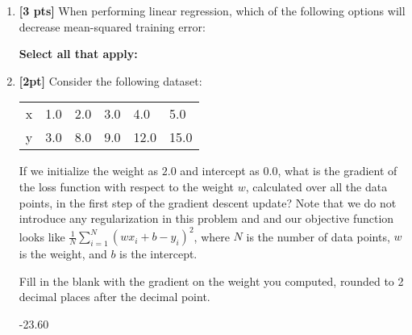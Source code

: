 \begin{enumerate}
    
    
    \newpage
    \item \textbf{[3 pts]} When performing linear regression, which of the following options will decrease mean-squared training error:
    
    \textbf{Select all that apply:}


    
    \item \textbf{[2pt]} \label{Q7_linear_regression} Consider the following dataset:
    \begin{table}[H]
    \centering
        \begin{tabular}{llllll}
        x & 1.0 & 2.0 & 3.0 & 4.0 & 5.0 \\
        y & 3.0 & 8.0 & 9.0 & 12.0 & 15.0
        \end{tabular}
    \end{table}
    If we initialize the weight as $2.0$ and intercept as $0.0$, what is the gradient of the loss function with respect to the weight $w$, calculated over all the data points, in the first step of the gradient descent update? Note that we do not introduce any regularization in this problem and and our objective function looks like $\frac{1}{N}\sum_{i=1}^N (wx_i + b - y_i)^2$, where $N$ is the number of data points, $w$ is the weight, and $b$ is the intercept.
    
    Fill in the blank with the gradient on the weight you computed, rounded to 2 decimal places after the decimal point.
    
    \begin{tcolorbox}[fit,height=1cm, width=4cm, blank, borderline={1pt}{-2pt},nobeforeafter]
    \begin{center}\huge-23.60\end{center}
    \end{tcolorbox}
    

\end{enumerate}
